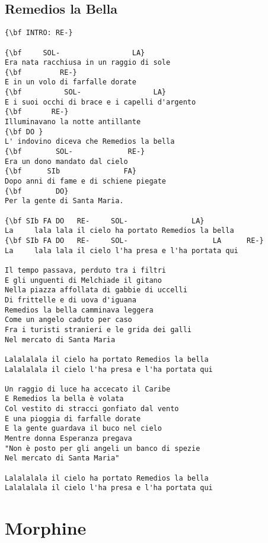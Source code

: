 \documentclass[a4paper]{article}
\begin{document}
\subsection{Remedios la Bella} %
\label{sub:Remedios la Bell}
\begin{Verbatim}[commandchars=\\\{\}]
{\bf INTRO: RE-}

{\bf     SOL-                 LA}
Era nata racchiusa in un raggio di sole
{\bf         RE-}
E in un volo di farfalle dorate
{\bf          SOL-                 LA}
E i suoi occhi di brace e i capelli d'argento
{\bf       RE-}
Illuminavano la notte antillante
{\bf DO }
L' indovino diceva che Remedios la bella
{\bf        SOL-             RE-}
Era un dono mandato dal cielo
{\bf      SIb               FA}
Dopo anni di fame e di schiene piegate
{\bf        DO}
Per la gente di Santa Maria.

{\bf SIb FA DO   RE-     SOL-               LA}
La     lala lala il cielo ha portato Remedios la bella
{\bf SIb FA DO   RE-     SOL-                    LA      RE-}
La     lala lala il cielo l'ha presa e l'ha portata qui

Il tempo passava, perduto tra i filtri 
E gli unguenti di Melchiade il gitano
Nella piazza affollata di gabbie di uccelli 
Di frittelle e di uova d'iguana
Remedios la bella camminava leggera
Come un angelo caduto per caso
Fra i turisti stranieri e le grida dei galli
Nel mercato di Santa Maria

Lalalalala il cielo ha portato Remedios la bella
Lalalalala il cielo l'ha presa e l'ha portata qui

Un raggio di luce ha accecato il Caribe
E Remedios la bella è volata
Col vestito di stracci gonfiato dal vento
E una pioggia di farfalle dorate
E la gente guardava il buco nel cielo
Mentre donna Esperanza pregava
"Non è posto per gli angeli un banco di spezie
Nel mercato di Santa Maria"

Lalalalala il cielo ha portato Remedios la bella
Lalalalala il cielo l'ha presa e l'ha portata qui
\end{Verbatim}
\newpage
\section{Morphine} %
\label{sec:Morphine}
\end{document}
